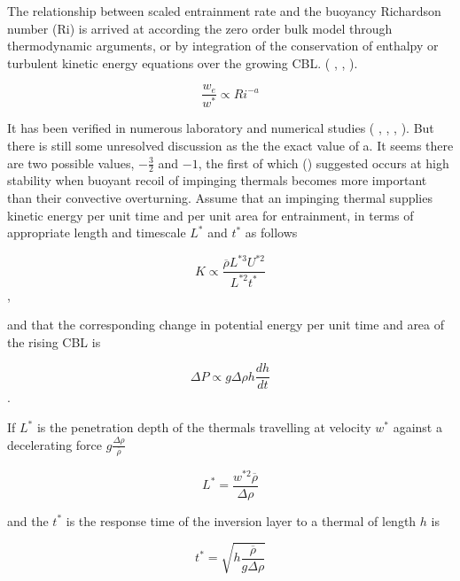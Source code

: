 The relationship between scaled entrainment rate and the buoyancy Richardson number (\acs{Ri}) is arrived at according the zero order bulk
model through thermodynamic arguments, or by integration of the conservation of enthalpy or turbulent kinetic energy equations
over the growing \acs{CBL}. (\citeauthor{Tennekes73} \cite{Tennekes73}, \citeauthor{Deardorff79} \cite{Deardorff79}, 
\citeauthor{FedConzMir04} \cite{FedConzMir04}). 

\begin{equation}
\frac{w_{e}}{w^{*}} \propto  Ri^{-a}
\end{equation}

It has been verified in numerous laboratory and numerical studies (\citeauthor{DearWill80} \cite{DearWill80}, \citeauthor{SullMoengStev} \cite{SullMoengStev}, \citeauthor{FedConzMir04} \cite{FedConzMir04}, \citeauthor{BrooksFowler2} \cite{BrooksFowler2}).  But there is still some 
unresolved discussion as the the exact value of a.  It seems there are two possible values, $-\frac{3}{2}$ and $-1$, the first of which \citeauthor{EllTurn} (\citeyear{EllTurn}) suggested occurs at high stability when buoyant recoil of impinging thermals becomes more important than their convective overturning. Assume that an impinging thermal supplies kinetic energy per unit time and per unit area for entrainment, in terms of appropriate length and timescale $L^{*}$ and $t^{*}$ as follows 

\begin{equation}
K \propto \frac{\overline{\rho} L^{*3} U^{*2}}{L^{*2} t^{*}}
\end{equation},

and that the corresponding change in potential energy per unit time and area of the rising \acs{CBL} is

\begin{equation}
\Delta P \propto g \Delta \rho h \frac{d h}{ dt}  
\end{equation}.

If $L^{*}$ is the penetration depth of the thermals travelling at velocity $w^{*}$ against a decelerating force
$g \frac{\Delta \rho}{\overline{\rho}}$

\begin{equation}
L^{*} = \frac{w^{*2} \overline{\rho}}{\Delta \rho}  
\end{equation}

and the $t^{*}$ is the response time of the inversion layer to a thermal of length $h$ is

\begin{equation}
t^{*} = \sqrt{h \frac{\overline{\rho}}{g \Delta \rho}}  
\end{equation}

